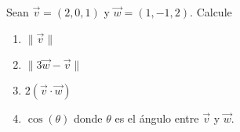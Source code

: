 Sean $\vec v = (2,0,1)$ y $\vec w=(1,-1,2)$. Calcule
\begin{enumerate}
\item $\|\vec v\|$
\item $\|3 \vec w - \vec v\|$
\item $2(\vec v \cdot \vec w)$
\item $\cos(\theta)$ donde $\theta$ es el \'angulo entre $\vec v$ y $\vec w$.
\end{enumerate}
